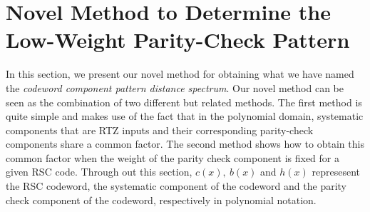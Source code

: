 \section{Novel Method to Determine the Low-Weight Parity-Check Pattern}
\label{sec3}
In this section, we present our novel method for obtaining what we have named the \textit{codeword component pattern distance spectrum}. %
Our novel method can be seen as the combination of two different but related methods. The first method is quite simple and makes use of the fact that in the polynomial domain, systematic components that are  RTZ inputs and their corresponding parity-check components share a common factor. 
The second method shows how to obtain this common factor when the weight of the parity check component is fixed for a given RSC code.  Through out this section, $c(x),~b(x)$ and $h(x)$ represesent the RSC codeword, the systematic component of the codeword and the parity check component of the codeword, respectively in polynomial notation.












